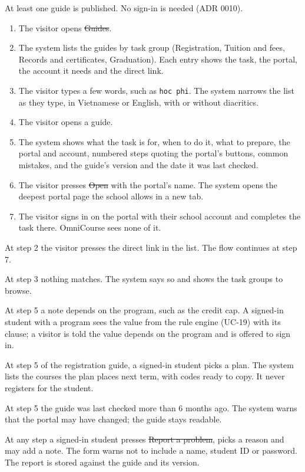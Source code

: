 At least one guide is published. No sign-in is needed (ADR 0010).

\begin{enumerate}
  \item The visitor opens \st{Guides}.
  \item The system lists the guides by task group (Registration, Tuition and fees, Records and certificates, Graduation).
        Each entry shows the task, the portal, the account it needs and the direct link.
  \item The visitor types a few words, such as \texttt{hoc phi}. The system narrows the list as they type, in Vietnamese or
        English, with or without diacritics.
  \item The visitor opens a guide.
  \item The system shows what the task is for, when to do it, what to prepare, the portal and account, numbered steps
        quoting the portal's buttons, common mistakes, and the guide's version and the date it was last checked.
  \item The visitor presses \st{Open} with the portal's name. The system opens the deepest portal page the school allows
        in a new tab.
  \item The visitor signs in on the portal with their school account and completes the task there. OmniCourse sees none of
        it.
\end{enumerate}

\begin{altflows}
  \item[A1. Straight to the link.] At step 2 the visitor presses the direct link in the list. The flow continues at step 7.
  \item[A2. No guide matches.] At step 3 nothing matches. The system says so and shows the task groups to browse.
  \item[A3. A value that depends on the program.] At step 5 a note depends on the program, such as the credit cap. A
        signed-in student with a program sees the value from the rule engine (UC-19) with its clause; a visitor is told the
        value depends on the program and is offered to sign in.
  \item[A4. Registration from a plan.] At step 5 of the registration guide, a signed-in student picks a plan. The system
        lists the courses the plan places next term, with codes ready to copy. It never registers for the student.
  \item[A5. Possibly out of date.] At step 5 the guide was last checked more than 6 months ago. The system warns that the
        portal may have changed; the guide stays readable.
  \item[A6. Report a problem.] At any step a signed-in student presses \st{Report a problem}, picks a reason and may add a
        note. The form warns not to include a name, student ID or password. The report is stored against the guide and its
        version.
\end{altflows}

